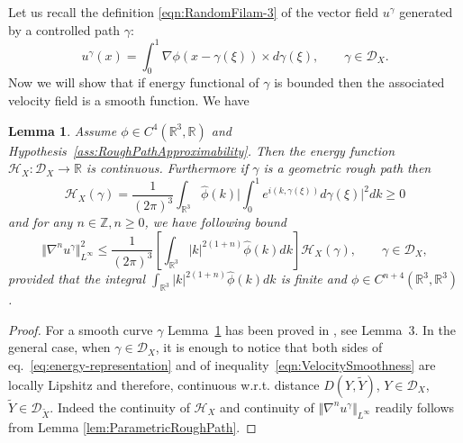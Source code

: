 \documentclass[11pt,a4paper,reqno]{amsart}%
\theoremstyle{plain}
\theoremstyle{remark}
\theoremstyle{plain}
\newtheorem{lemma}[theorem]{Lemma}
\numberwithin{equation}{section}
\def\Rnu{{\mathbb R}}
\begin{document}
Let us recall the definition \eqref{eqn:RandomFilam-3} of the vector field $u^\gamma$ generated by a controlled path $\gamma$:
\begin{equation}
u^\gamma(x)=\int_0^1\nabla\phi(x-\gamma(\xi))\times d \gamma(\xi),\qquad \gamma\in
\mathcal{D}_X.\label{eqn:RandomFilam-3'}
\end{equation}
Now we will show that if energy functional of $\gamma$ is bounded then the
associated velocity field  is a smooth function. We have
\begin{lemma}%
\label{lem:VelocitySmoothness}
Assume $\phi\in C^4(\Rnu^3,\Rnu)$ and Hypothesis~\ref{ass:RoughPathApproximability}. Then the energy function 
$\mathcal{H}_X:\mathcal{D}_X\to\Rnu$ is  continuous. Furthermore if $\gamma$ is a geometric rough path then
\begin{equation}
\label{eq:energy-representation}
\mathcal{H}_X(\gamma) =\frac{1}{(2\pi)^3}\int_{\Rnu^3}\hat{\phi}(k)\Big\vert \int_0^1 e^{i(k,\gamma(\xi))}d\gamma(\xi)\Big\vert^2dk \ge 0
\end{equation}
and for any $n\in \mathbb{Z},n\geq 0$, we have following bound
\begin{equation}
\Vert \nabla^n u^{\gamma}\Vert^2_{L^{\infty}}\leq
\frac{1}{(2\pi)^{3}}\left[\int_{\Rnu^3}\vert {k}\vert^{2(1+n)}\hat{\phi}({k})d{k}\right]\mathcal{H}_X(\gamma),\qquad
\gamma\in\mathcal{D}_X,\label{eqn:VelocitySmoothness}
\end{equation}
provided that the integral
$\int_{\Rnu^3}\vert {k}\vert^{2(1+n)}\hat{\phi}({k})d{k}$ is
finite and $\phi\in C^{n+4}(\Rnu^3,\Rnu^3)$.
\end{lemma}
\begin{proof}%
For a smooth curve $\gamma$ Lemma~\ref{lem:VelocitySmoothness} has been proved in
\cite{[Bers+Gub_2007]}, see  Lemma~3. In the general case, when
$\gamma\in\mathcal{D}_X$, it is enough to notice that both sides
of eq.~\eqref{eq:energy-representation} and of inequality~\eqref{eqn:VelocitySmoothness} are locally Lipshitz
and therefore, continuous w.r.t. distance
$D(Y,\tilde{Y})$, $Y\in\mathcal{D}_X$,
$\tilde{Y}\in\mathcal{D}_{\tilde{X}}$. Indeed the continuity of
$\mathcal{H}_X$  and continuity of $\Vert \nabla^n
u^{\gamma}\Vert_{L^{\infty}}$ readily follows from Lemma
\ref{lem:ParametricRoughPath}.
\end{proof}
\end{document}
